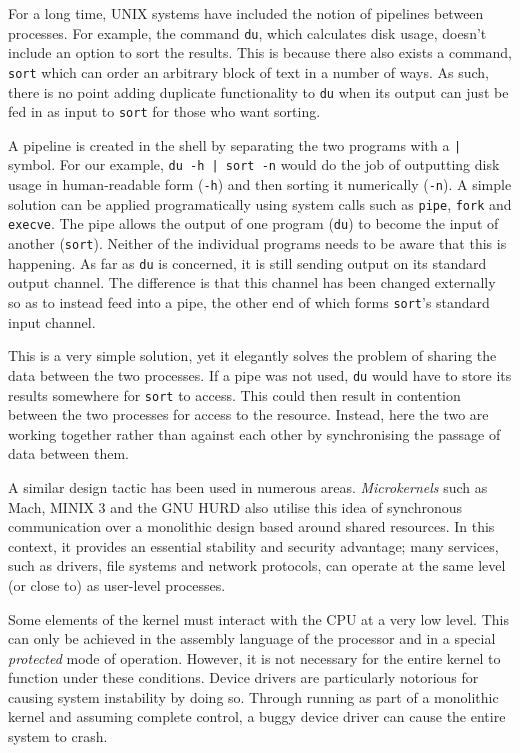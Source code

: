 For a long time, UNIX systems have included the notion of pipelines
between processes.  For example, the command \texttt{du}, which
calculates disk usage, doesn't include an option to sort the results.
This is because there also exists a command, \texttt{sort} which can
order an arbitrary block of text in a number of ways.  As such, there
is no point adding duplicate functionality to \texttt{du} when its
output can just be fed in as input to \texttt{sort} for those who want
sorting.

A pipeline is created in the shell by separating the two programs with
a \texttt{|} symbol.  For our example, \texttt{du -h | sort -n} would
do the job of outputting disk usage in human-readable form
(\texttt{-h}) and then sorting it numerically (\texttt{-n}).  A simple
solution can be applied programatically using system calls such as
\texttt{pipe}, \texttt{fork} and \texttt{execve}.  The pipe allows the
output of one program (\texttt{du}) to become the input of another
(\texttt{sort}).  Neither of the individual programs needs to be aware
that this is happening.  As far as \texttt{du} is concerned, it is
still sending output on its standard output channel.  The difference
is that this channel has been changed externally so as to instead feed
into a pipe, the other end of which forms \texttt{sort}'s standard
input channel.

This is a very simple solution, yet it elegantly solves the problem of
sharing the data between the two processes.  If a pipe was not used,
\texttt{du} would have to store its results somewhere for \texttt{sort}
to access.  This could then result in contention between the two
processes for access to the resource.  Instead, here the two are
working together rather than against each other by synchronising the
passage of data between them.

A similar design tactic has been used in numerous areas.
\emph{Microkernels} such as Mach\cite{mach}, MINIX 3\cite{minix3} and
the GNU HURD\cite{hurd} also utilise this idea of synchronous
communication over a monolithic design based around shared resources.
In this context, it provides an essential stability and security
advantage; many services, such as drivers, file systems and network
protocols, can operate at the same level (or close to) as user-level
processes.

Some elements of the kernel must interact with the CPU at a very low
level.  This can only be achieved in the assembly language of the
processor and in a special \emph{protected} mode of operation.
However, it is not necessary for the entire kernel to function under
these conditions.  Device drivers are particularly notorious for
causing system instability by doing so.  Through running as part of a
monolithic kernel and assuming complete control, a buggy device driver
can cause the entire system to crash.

